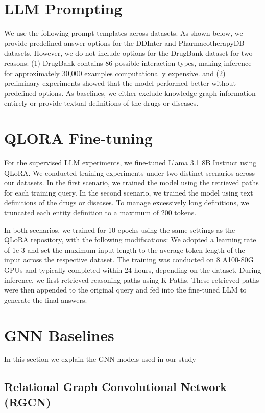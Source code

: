 \newcommand{\cmark}{\textcolor[rgb]{0,0.6,0}{\checkmark}}
\newcommand{\xmark}{\textcolor{red}{$\times$}}

\section{LLM Prompting} \label{app:prompting}
We use the following prompt templates across datasets.
As shown below, we provide predefined answer options for the DDInter and PharmacotherapyDB datasets. 
However, we do not include options for the DrugBank dataset for two reasons: 
(1) DrugBank contains 86 possible interaction types, making inference for approximately 30,000 examples computationally expensive.
and (2) preliminary experiments showed that the model performed better without predefined options.
As baselines, we either exclude knowledge graph information entirely or provide textual definitions of the drugs or diseases.



\section{QLORA Fine-tuning} \label{app:qlora}
For the supervised LLM experiments, we fine-tuned Llama 3.1 8B Instruct using QLoRA. We conducted training experiments under two distinct scenarios across our datasets.
In the first scenario, we trained the model using the retrieved paths for each training query.  
In the second scenario, we trained the model using text definitions of the drugs or diseases. 
To manage excessively long definitions, we truncated each entity definition to a maximum of 200 tokens.

In both scenarios, we trained for 10 epochs using the same settings as the QLoRA repository, with the following modifications: 
We adopted a learning rate of 1e-3 and set the maximum input length to the average token length of the input across the respective dataset. 
The training was conducted on 8 A100-80G GPUs and typically completed within 24 hours, depending on the dataset.
During inference, we first retrieved reasoning paths using K-Paths.
These retrieved paths were then appended to the original query and fed into the fine-tuned LLM to generate the final answers.

\section{GNN Baselines}
In this section we explain the GNN models used in our study
\subsection{Relational Graph Convolutional Network (RGCN)}

